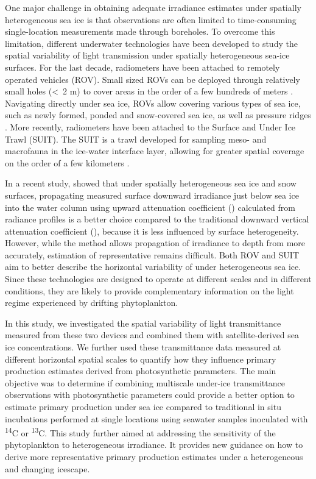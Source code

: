 One major challenge in obtaining adequate irradiance estimates under spatially heterogeneous sea ice is that observations are often limited to time-consuming single-location measurements made through boreholes. To overcome this limitation, different underwater technologies have been developed to study the spatial variability of light transmission under spatially heterogeneous sea-ice surfaces. For the last decade, radiometers have been attached to remotely operated vehicles (ROV). Small sized ROVs can be deployed through relatively small holes (\textless~2 m) to cover areas in the order of a few hundreds of meters \citep{Katlein2015, Katlein2017, Ambrose2005, Lund-Hansen2018, Nicolaus2010}. Navigating directly under sea ice, ROVs allow covering various types of sea ice, such as newly formed, ponded and snow-covered sea ice, as well as pressure ridges \citep{Katlein2017}. More recently, radiometers have been attached to the Surface and Under Ice Trawl (SUIT). The SUIT is a trawl developed for sampling meso- and macrofauna in the ice-water interface layer, allowing for greater spatial coverage on the order of a few kilometers \citep{Flores2012, Lange2016, Lange2017}.

In a recent study, \citet{Massicotte2018} showed that under spatially heterogeneous sea ice and snow surfaces, propagating measured surface downward irradiance just below sea ice \edzerominus{} into the water column using upward attenuation coefficient (\klu{}) calculated from radiance profiles is a better choice compared to the traditional downward vertical attenuation coefficient (\ked{}), because it is less influenced by surface heterogeneity. However, while the method allows propagation of irradiance to depth from \edzerominus{} more accurately, estimation of representative \edzerominus{} remains difficult. Both ROV and SUIT aim to better describe the horizontal variability of \edzerominus{} under heterogeneous sea ice. Since these technologies are designed to operate at different scales and in different conditions, they are likely to provide complementary information on the light regime experienced by drifting phytoplankton.

In this study, we investigated the spatial variability of light transmittance measured from these two devices and combined them with satellite-derived sea ice concentrations. We further used these transmittance data measured at different horizontal spatial scales to quantify how they influence primary production estimates derived from photosynthetic parameters. The main objective was to determine if combining multiscale under-ice transmittance observations with photosynthetic parameters could provide a better option to estimate primary production under sea ice compared to traditional in situ incubations performed at single locations using seawater samples inoculated with \textsuperscript{14}C or \textsuperscript{13}C.  This study further aimed at addressing the sensitivity of the phytoplankton to heterogeneous irradiance. It provides new guidance on how to derive more representative primary production estimates under a heterogeneous and changing icescape.